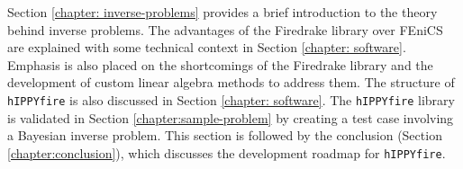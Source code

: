 Section \ref{chapter: inverse-problems} provides a brief introduction to the theory behind inverse problems. The advantages of the Firedrake library over FEniCS are explained with some technical context in Section \ref{chapter: software}. Emphasis is also placed on the shortcomings of the Firedrake library and the development of custom linear algebra methods to address them. The structure of \texttt{hIPPYfire} is also discussed in Section \ref{chapter: software}. The \texttt{hIPPYfire} library is validated in Section \ref{chapter:sample-problem} by creating a test case involving a Bayesian inverse problem. This section is followed by the conclusion (Section \ref{chapter:conclusion}), which discusses the development roadmap for \texttt{hIPPYfire}.